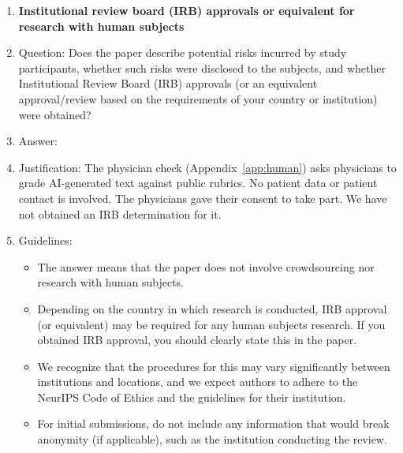 \begin{enumerate}
\item {\bf Institutional review board (IRB) approvals or equivalent for research with human subjects}
    \item[] Question: Does the paper describe potential risks incurred by study participants, whether such risks were disclosed to the subjects, and whether Institutional Review Board (IRB) approvals (or an equivalent approval/review based on the requirements of your country or institution) were obtained?
    \item[] Answer: \answerNo{}
    \item[] Justification: The physician check (Appendix~\ref{app:human}) asks physicians to grade AI-generated text against public rubrics. No patient data or patient contact is involved. The physicians gave their consent to take part. We have not obtained an IRB determination for it.
    \item[] Guidelines:
    \begin{itemize}
        \item The answer \answerNA{} means that the paper does not involve crowdsourcing nor research with human subjects.
        \item Depending on the country in which research is conducted, IRB approval (or equivalent) may be required for any human subjects research. If you obtained IRB approval, you should clearly state this in the paper.
        \item We recognize that the procedures for this may vary significantly between institutions and locations, and we expect authors to adhere to the NeurIPS Code of Ethics and the guidelines for their institution.
        \item For initial submissions, do not include any information that would break anonymity (if applicable), such as the institution conducting the review.
    \end{itemize}


\end{enumerate}
